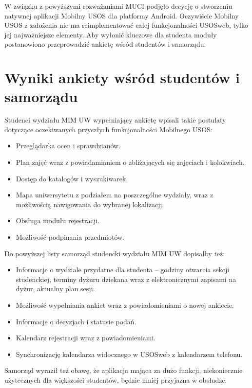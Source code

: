 \documentclass{pracamgr}
\begin{document}
W związku z powyższymi rozważaniami MUCI podjęło decycję o stworzeniu natywnej
aplikacji Mobilny USOS dla platformy Android. Oczywiście Mobilny USOS z założenia
nie ma reimplementować całej funkcjonalności USOSweb, tylko jej najważniejsze
elementy. Aby wyłonić kluczowe dla studenta moduły postanowiono przeprowadzić
ankietę wśród studentów i samorządu.

\section{Wyniki ankiety wśród studentów i samorządu}

Studenci wydziału MIM UW wypełniający ankietę wpisali takie postulaty dotyczące
oczekiwanych przyszłych funkcjonalności Mobilnego USOS:

\begin{itemize}
	\item Przeglądarka ocen i sprawdzianów.
	\item Plan zajęć wraz z powiadamianiem o zbliżających się zajęciach
	      i kolokwiach.
	\item Dostęp do katalogów i wyszukiwarek.
	\item Mapa uniwersytetu z podziałem na poszczególne wydziały, wraz z
	      możliwością nawigowania do wybranej lokalizacji.
	\item Obsługa modułu rejestracji.
	\item Możliwość podpinania przedmiotów.
\end{itemize}

Do powyższej listy samorząd studencki wydziału MIM UW dopisałby też:

\begin{itemize}
	\item Informacje o wydziale przydatne dla studenta -- godziny otwarcia sekcji
	      studenckiej, terminy dyżuru dziekana wraz z elektronicznymi zapisami na
	      dyżur, aktualny plan sesji.
	\item Możliwość wypełniania ankiet wraz z powiadomieniami o nowej ankiecie.
	\item Informacje o decyzjach i statusie podań.
	\item Kalendarz rejestracji wraz z powiadomieniami.
	\item Synchronizację kalendarza widocznego w USOSweb z kalendarzem telefonu.
\end{itemize}

Samorząd wyraził też obawę, że aplikacja mająca za dużo funkcji, niekoniecznie
użytecznych dla większości studentów, będzie mniej przyjazna w obsłudze.
\end{document}

